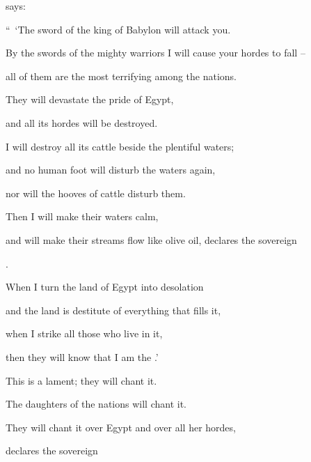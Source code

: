 {{}
says:
\par }{\Q “ ‘The sword
of the king
of Babylon
will attack you.
\par }{\Q {}By the swords
of the mighty warriors
I will cause your hordes
to fall
–
\par }{\Q all
of them are the most terrifying
among the nations.
\par }{\Q They will devastate
the pride
of Egypt,
\par }{\Q and all
its hordes
will be destroyed.
\par }{\Q {}I will destroy
all
its cattle
beside
the plentiful
waters;
\par }{\Q and no
human
foot
will disturb
the waters again,
\par }{\Q nor
will the hooves
of cattle
disturb them.
\par }{\Q {}Then
I will make their waters
calm,
\par }{\Q and will make their streams
flow
like olive oil,
declares
the sovereign

{}.
\par }{\Q {}When
I turn
the
land
of Egypt
into desolation
\par }{\Q and the land
is destitute of everything
that fills it,
\par }{\Q when I strike
all
those who live
in it,
\par }{\Q then they will know
that
I am
the {}.’
\par }{\Q {}This is
a lament;
they will chant it.
\par }{\Q The daughters
of the nations
will chant
it.
\par }{\Q They will chant
it over
Egypt
and over
all
her hordes,
\par }{\Q declares
the sovereign

}
